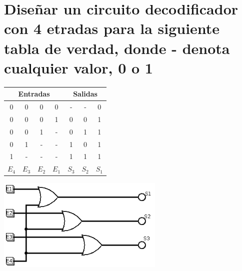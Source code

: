 \documentclass[11pt,letterpaper]{article}
\begin{document}
\section*{Diseñar un circuito decodificador con 4 etradas para la siguiente tabla de verdad, donde - denota cualquier valor, 0 o 1}
\begin{table}[h!]
\centering
\begin{tabular}{| c | c | c | c | | c | c | c |}
\hline
\multicolumn{4}{|c||}{Entradas} & \multicolumn{3}{c|}{Salidas} \\
\hline
0 & 0 & 0 & 0 & - & - & 0 \\
0 & 0 & 0 & 1 & 0 & 0 & 1 \\
0 & 0 & 1 & - & 0 & 1 & 1 \\
0 & 1 & - & - & 1 & 0 & 1 \\
1 & - & - & - & 1 & 1 & 1 \\
\hline
$E_4$ & $E_3$ & $E_2$ & $E_1$ & $S_3$ & $S_2$ & $S_1$ \\
\hline
\end{tabular}
\end{table}

\begin{center}
  \includegraphics[width=8cm]{./imagenes/Ej4.png}
\end{center}


\end{document}

